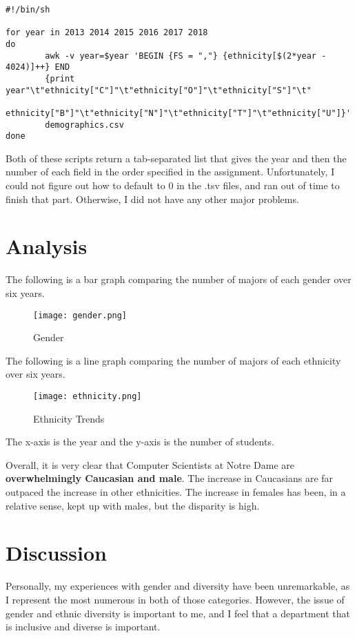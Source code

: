 \documentclass{article}
\begin{document}
\begin{verbatim}
#!/bin/sh

for year in 2013 2014 2015 2016 2017 2018
do
        awk -v year=$year 'BEGIN {FS = ","} {ethnicity[$(2*year - 4024)]++} END 
        {print year"\t"ethnicity["C"]"\t"ethnicity["O"]"\t"ethnicity["S"]"\t"
        ethnicity["B"]"\t"ethnicity["N"]"\t"ethnicity["T"]"\t"ethnicity["U"]}' 
        demographics.csv
done
\end{verbatim}

Both of these scripts return a tab-separated list that gives the year and then the number of each field in the order specified in the assignment.  Unfortunately, I could not figure out how to default to 0 in the .tsv files, and ran out of time to finish that part.  Otherwise, I did not have any other major problems.

\section{Analysis}

The following is a bar graph comparing the number of majors of each gender over six years.

\begin{figure}[!h]
\centering
\texttt{[image: gender.png]}
\caption{Gender}
\label{fig:gender}
\end{figure}

The following is a line graph comparing the number of majors of each ethnicity over six years.

\begin{figure}[!h]
\centering
\texttt{[image: ethnicity.png]}
\caption{Ethnicity Trends}
\label{fig:ethnicity}
\end{figure}

The x-axis is the year and the y-axis is the number of students.

Overall, it is very clear that Computer Scientists at Notre Dame are \textbf{overwhelmingly Caucasian and male}. The increase in Caucasians are far outpaced the increase in other ethnicities.  The increase in females has been, in a relative sense, kept up with males, but the disparity is high.

\section{Discussion}

Personally, my experiences with gender and diversity have been unremarkable, as I represent the most numerous in both of those categories.  However, the issue of gender and ethnic diversity is important to me, and I feel that a department that is inclusive and diverse is important.  
\end{document}
